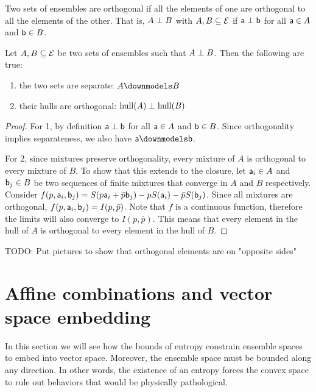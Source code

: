 \begin{mathSection}
\begin{defn}
	Two sets of ensembles are orthogonal if all the elements of one are orthogonal to all the elements of the other. That is, $A \ortho B$ with $A, B \subseteq \Ens$ if $\ens[a] \ortho \ens[b]$ for all $\ens[a] \in A$ and $\ens[b] \in B$. 
\end{defn}

\begin{prop}
	Let $A, B \subseteq \Ens$ be two sets of ensembles such that $A \ortho B$. Then the following are true:
	\begin{enumerate}
		\item the two sets are separate: $A \separate B$
		\item their hulls are orthogonal: $\hull(A) \ortho \hull(B)$
	\end{enumerate}
\end{prop}

\begin{proof}
	For 1, by definition $\ens[a] \ortho \ens[b]$ for all $\ens[a] \in A$ and $\ens[b] \in B$. Since orthogonality implies separateness, we also have $\ens[a] \separate \ens[b]$.
	
	For 2, since mixtures preserve orthogonality, every mixture of $A$ is orthogonal to every mixture of $B$. To show that this extends to the closure, let $\ens[a]_i \in A$ and $\ens[b]_j \in B$ be two sequences of finite mixtures that converge in $A$ and $B$ respectively. Consider $f(p,\ens[a]_i, \ens[b]_j) = S(p \ens[a]_i + \bar{p} \ens[b]_j) - p S(\ens[a]_i) - \bar{p} S(\ens[b]_j)$. Since all mixtures are orthogonal, $f(p,\ens[a]_i, \ens[b]_j) = I(p,\bar{p})$. Note that $f$ is a continuous function, therefore the limits will also converge to $I(p,\bar{p})$. This means that every element in the hull of $A$ is orthogonal to every element in the hull of $B$.
\end{proof}
\end{mathSection}

TODO: Put pictures to show that orthogonal elements are on "opposite sides"

\section{Affine combinations and vector space embedding}

In this section we will see how the bounds of entropy constrain ensemble spaces to embed into vector space. Moreover, the ensemble space must be bounded along any direction. In other words, the existence of an entropy forces the convex space to rule out behaviors that would be physically pathological.

